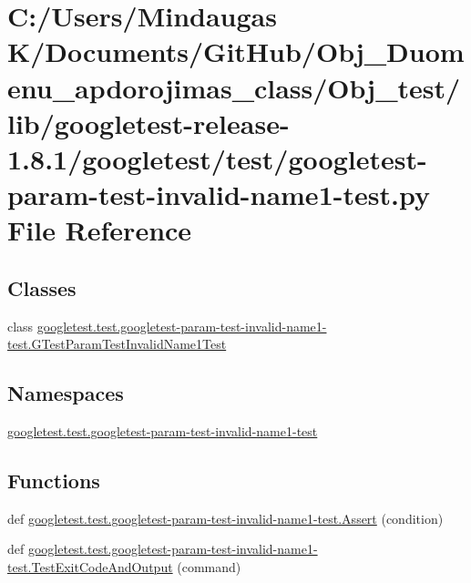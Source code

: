 \hypertarget{_obj__test_2lib_2googletest-release-1_88_81_2googletest_2test_2googletest-param-test-invalid-name1-test_8py}{}\section{C\+:/\+Users/\+Mindaugas K/\+Documents/\+Git\+Hub/\+Obj\+\_\+\+Duomenu\+\_\+apdorojimas\+\_\+class/\+Obj\+\_\+test/lib/googletest-\/release-\/1.8.1/googletest/test/googletest-\/param-\/test-\/invalid-\/name1-\/test.py File Reference}
\label{_obj__test_2lib_2googletest-release-1_88_81_2googletest_2test_2googletest-param-test-invalid-name1-test_8py}
\subsection*{Classes}
\begin{DoxyCompactItemize}
\item 
class \mbox{\hyperlink{classgoogletest_1_1test_1_1googletest-param-test-invalid-name1-test_1_1_g_test_param_test_invalid_name1_test}{googletest.\+test.\+googletest-\/param-\/test-\/invalid-\/name1-\/test.\+G\+Test\+Param\+Test\+Invalid\+Name1\+Test}}
\end{DoxyCompactItemize}
\subsection*{Namespaces}
\begin{DoxyCompactItemize}
\item 
 \mbox{\hyperlink{namespacegoogletest_1_1test_1_1googletest-param-test-invalid-name1-test}{googletest.\+test.\+googletest-\/param-\/test-\/invalid-\/name1-\/test}}
\end{DoxyCompactItemize}
\subsection*{Functions}
\begin{DoxyCompactItemize}
\item 
def \mbox{\hyperlink{namespacegoogletest_1_1test_1_1googletest-param-test-invalid-name1-test_a0e1cc957de2fcf5c8169eeb022f126c3}{googletest.\+test.\+googletest-\/param-\/test-\/invalid-\/name1-\/test.\+Assert}} (condition)
\item 
def \mbox{\hyperlink{namespacegoogletest_1_1test_1_1googletest-param-test-invalid-name1-test_a4f8537626401b283aac741d15909da9c}{googletest.\+test.\+googletest-\/param-\/test-\/invalid-\/name1-\/test.\+Test\+Exit\+Code\+And\+Output}} (command)
\end{DoxyCompactItemize}
